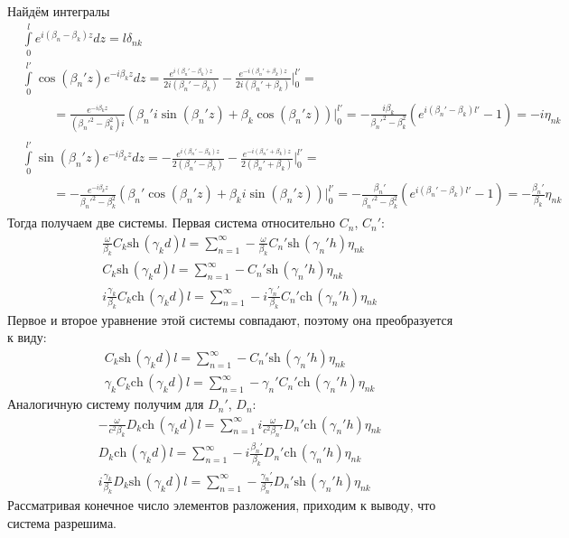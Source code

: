 \documentclass[a4paper,12pt]{extarticle} %
\renewcommand{\cosh}{\mathrm{ch}\,}
\renewcommand{\sinh}{\mathrm{sh}\,}
\begin{document}
Найдём интегралы 
\begin{align*}
	& 
	\int\limits_{0}^{l} e^{i (\beta_n - \beta_k) z} dz = l \delta_{nk} \\
	& 
	\int\limits_{0}^{l'} \cos(\beta_n' z) e^{- i \beta_k z} dz =
	\frac{e^{i (\beta_n' - \beta_k) z}}{2i(\beta_n' - \beta_k)} - \frac{e^{- i (\beta_n' + \beta_k) z}}{2i(\beta_n' + \beta_k)} \Bigg|_{0}^{l'} = \\
	&\qquad
	\begin{gathered}
		=
		\frac{e^{- i \beta_k z}}{(\beta_n'^2 - \beta_k^2)i} 
			\left(
				\beta_n' i \sin (\beta_n' z) + 
				\beta_k \cos (\beta_n' z)
			\right) \Bigg|_{0}^{l'} =
		-\frac{i\beta_k}{\beta_n'^2 - \beta_k^2} \left(e^{i (\beta_n'- \beta_k) l'} - 1 \right) = -i\eta_{nk}	
	\end{gathered} \\ 
	& 
	\int\limits_{0}^{l'} \sin(\beta_n' z) e^{- i \beta_k z} dz =
	-\frac{e^{i (\beta_n' - \beta_k) z}}{2(\beta_n' - \beta_k)} - \frac{e^{- i (\beta_n' + \beta_k) z}}{2(\beta_n' + \beta_k)} \Bigg|_{0}^{l'} = \\
	&\qquad
	\begin{gathered}
		=
		- \frac{e^{- i \beta_k z}}{\beta_n'^2 - \beta_k^2} 
			\left(
				\beta_n' \cos (\beta_n' z) + 
				\beta_k i \sin (\beta_n' z)
			\right) \Bigg|_{0}^{l'} =
		-\frac{\beta_n'}{\beta_n'^2 - \beta_k^2} \left(e^{i (\beta_n'- \beta_k) l'} - 1 \right) = - \frac{\beta_n'}{\beta_k} \eta_{nk}	
	\end{gathered}
\end{align*}
Тогда получаем две системы. Первая система относительно $C_n$, $C_n'$:
\begin{align*}
	& 
	\frac{\omega}{\beta_k} C_k \sinh (\gamma_k d) l = 
	\sum_{n = 1}^{\infty} - \frac{\omega}{\beta_k} C_n' \sinh (\gamma_n' h) \eta_{nk} \\
	&
	C_k \sinh (\gamma_k d) l =
	\sum_{n = 1}^{\infty} - C_n' \sinh (\gamma_n' h) \eta_{nk} \\
	&
	i\frac{\gamma_k}{\beta_k} C_k \cosh (\gamma_k d) l =
	\sum_{n = 1}^{\infty} -i\frac{\gamma_n'}{\beta_k} C_n' \cosh (\gamma_n' h) \eta_{nk}
\end{align*}
Первое и второе уравнение этой системы совпадают, поэтому она преобразуется к виду:
\begin{align*}
&
C_k \sinh (\gamma_k d) l =
\sum_{n = 1}^{\infty} - C_n' \sinh (\gamma_n' h) \eta_{nk} \\
&
\gamma_k C_k \cosh (\gamma_k d) l =
\sum_{n = 1}^{\infty} - \gamma_n' C_n' \cosh (\gamma_n' h) \eta_{nk}
\end{align*}
Аналогичную систему получим для $D_n'$, $D_n$:
\begin{align*}
&
- \frac{\omega}{c^2\beta_k} D_k \cosh (\gamma_k d) l =
\sum_{n = 1}^{\infty} i \frac{\omega}{c^2\beta_n'} D_n' \cosh (\gamma_n' h) \eta_{nk} \\
&
D_k \cosh (\gamma_k d) l =
\sum_{n = 1}^{\infty} - i \frac{\beta_n'}{\beta_k} D_n' \cosh (\gamma_n' h) \eta_{nk}\\
&
i \frac{\gamma_k}{\beta_k} D_k \sinh (\gamma_k d) l =
\sum_{n = 1}^{\infty} -\frac{\gamma_n'}{\beta_n'} D_n' \sinh (\gamma_n' h) \eta_{nk}
\end{align*}
Рассматривая конечное число элементов разложения, приходим к выводу, что система разрешима.
\end{document}
